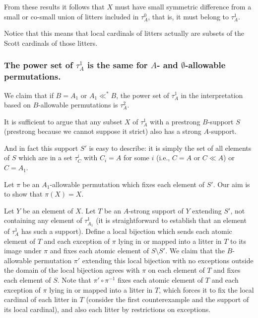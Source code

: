 \documentclass[12pt]{article}
\begin{document}
From these results it follows that $X$ must have small symmetric difference from a small or co-small union of litters included in $\tau^0_A$, that is, it must belong to $\tau^1_A$.

Notice that this means that local cardinals of litters actually are subsets of the Scott cardinals of those litters.

\newpage

\subsubsection{The power set of $\tau^1_A$ is the same for $A$- and $\emptyset$-allowable permutations.}

We claim that if $B=A_1$ or $A_1 \ll^* B$, the power set of  $\tau^1_A$ in
the interpretation based on $B$-allowable permutations is $\tau^2_A$.

It is sufficient to argue that any subset $X$ of $\tau^1_A$ with a prestrong $B$-support $S$ (prestrong because we cannot suppose it strict) also has a strong $A$-support.

And in fact this support $S'$ is easy to describe:  it is simply the set of all elements of $S$ which are in a set $\tau^i_C$ with $C_i = A$ for some $i$ (i.e., $C=A$ or $C \ll A$) or $C=A_1$.

Let $\pi$ be an $A_1$-allowable permutation which fixes each element of $S'$.  Our aim is to show that $\pi(X)=X$.

Let $Y$ be an element of $X$.  Let $T$ be an $A$-strong support of $Y$ extending $S'$, not containing any element of $\tau^1_{A_1}$ (it is straightforward to establish that
an element of $\tau^1_A$ has such a support).  Define a local bijection which sends each atomic element of $T$ and each exception of $\pi$ lying in or mapped into a litter in $T$ to its image under $\pi$
and fixes each atomic element of $S \setminus S'$.  We claim that the $B$-allowable permutation $\pi'$ extending this local bijection with no exceptions outside the domain of the local bijection  agrees with $\pi$ on each element of $T$ and fixes each element of $S$.  Note that $\pi' \circ \pi^{-1}$ fixes each atomic element of $T$ and each exception of $\pi$ lying in or mapped into a litter in $T$, which forces it to fix the local cardinal of each litter in $T$ (consider the first counterexample and the support of its local cardinal), and also each litter by restrictions on exceptions. 
\end{document}

